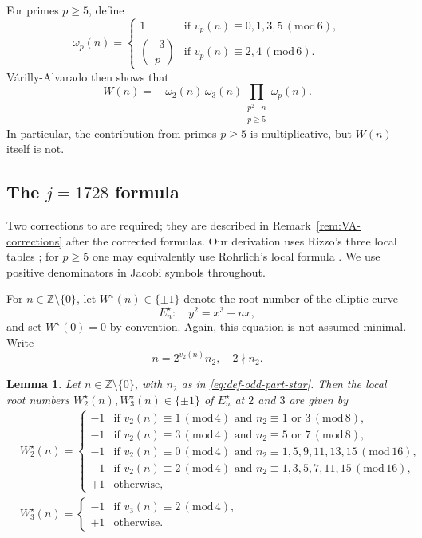 \documentclass[12pt,reqno]{amsart}
\numberwithin{equation}{section}
\newtheorem{lemma}[theorem]{Lemma}
\theoremstyle{definition}
\renewcommand{\ge}{\geqslant}
\newcommand{\ZZ}{\mathbb{Z}}
\newcommand{\rw}{W}
\renewcommand{\pmod}[1]{\,(\mathrm{mod}\,#1)}
\begin{document}
For primes $p\ge 5$, define
\begin{equation}\label{eq:def-omega-p}
\omega_p(n)=
\begin{cases}
1 & \text{if } v_p(n)\equiv 0,1,3,5 \pmod 6,\\[0.2em]
\left(\dfrac{-3}{p}\right) & \text{if } v_p(n)\equiv 2,4 \pmod 6.
\end{cases}
\end{equation}
V\'arilly-Alvarado \cite[Proposition~4.4]{VA} then shows that
\begin{equation}\label{eq:rootnumber-factor}
\rw(n)
=-\,\omega_2(n)\,\omega_3(n) \prod_{\substack{p^2\mid n\\ p\ge 5}} \omega_p(n).
\end{equation}
In particular, the contribution from primes $p\ge 5$ is multiplicative, but $\rw(n)$ itself is not.

\subsection{The \texorpdfstring{$j=1728$}{j=1728} formula}

Two corrections to \cite[Lemma~4.7 and Proposition~4.8]{VA} are required; they are described in Remark~\ref{rem:VA-corrections} after the corrected formulas.
Our derivation uses Rizzo's three local tables \cite[Tables~I--III]{Riz03}; for $p\ge5$ one may equivalently use Rohrlich's local formula \cite{Roh93}.
We use positive denominators in Jacobi symbols throughout.

For $n\in\ZZ\setminus\{0\}$, let $\rw^\star(n)\in\{\pm 1\}$ denote the root number of the elliptic curve
\[
E_n^\star:\quad y^2=x^3+n x,
\]
and set $\rw^\star(0)=0$ by convention.
Again, this equation is not assumed minimal.
Write
\begin{equation}\label{eq:def-odd-part-star}
n=2^{v_2(n)}n_2,\quad 2\nmid n_2.
\end{equation}
\begin{lemma}\label{lem:W23-1728}
Let $n\in\ZZ\setminus\{0\}$, with $n_2$ as in \eqref{eq:def-odd-part-star}.
Then the local root numbers $\rw_2^\star(n),\rw_3^\star(n)\in\{\pm1\}$ of $E_n^\star$ at $2$ and $3$ are given by
\begin{align*}
& \rw_2^\star(n)=
\begin{cases}
-1 & \text{if } v_2(n)\equiv 1 \pmod 4 \text{ and } n_2\equiv 1 \text{ or } 3 \pmod 8,\\
-1 & \text{if } v_2(n)\equiv 3 \pmod 4 \text{ and } n_2\equiv 5 \text{ or } 7 \pmod 8,\\
-1 & \text{if } v_2(n)\equiv 0 \pmod 4 \text{ and } n_2\equiv 1,5,9,11,13,15 \pmod{16},\\
-1 & \text{if } v_2(n)\equiv 2 \pmod 4 \text{ and } n_2\equiv 1,3,5,7,11,15 \pmod{16},\\
+1 & \text{otherwise},
\end{cases}
\\
& \rw_3^\star(n)=
\begin{cases}
-1 & \text{if } v_3(n)\equiv 2 \pmod 4,\\
+1 & \text{otherwise}.
\end{cases}
\end{align*}
\end{lemma}
\end{document}
